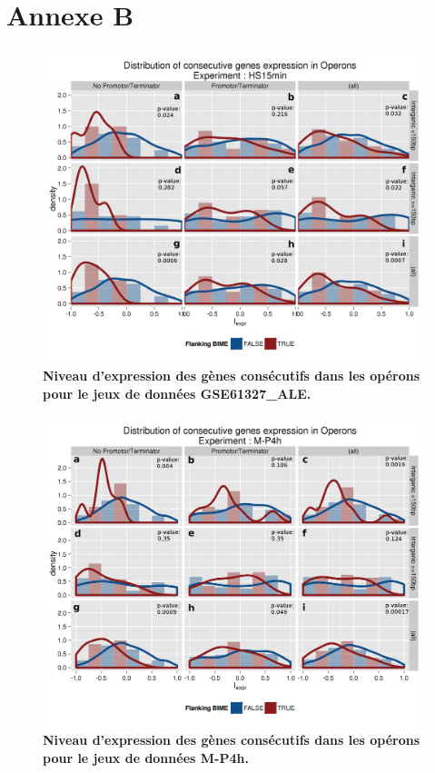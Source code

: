\documentclass[12pt,a4paper]{report}
\begin{document}
\chapter*{Annexe B}
\label{annexeOperon}
\begin{figure}[h!]
\centerline{\includegraphics[scale=0.7]{figures/supData/genesOperon_histoDens_HS15.png}}
\caption{\textbf{Niveau d'expression des gènes consécutifs dans les opérons pour le jeux de données GSE61327\_ALE.}}
\end{figure}

\begin{figure}[!h]
\centerline{\includegraphics[scale=0.7]{figures/supData/genesOperon_histoDens_M-P4h.png}}
\caption{\textbf{Niveau d'expression des gènes consécutifs dans les opérons pour le jeux de données M-P4h.}}
\end{figure}
\end{document}
